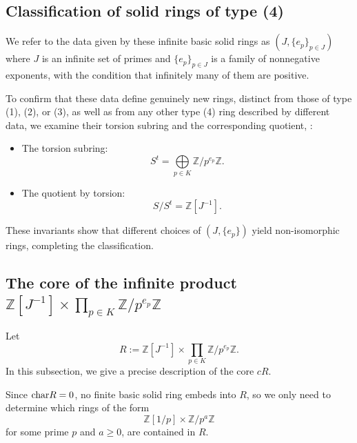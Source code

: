 \documentclass{amsart}
\newcommand{\chara}{{\textup{char}}}
\newcommand{\Z}{{\mathbb Z}}
\begin{document}
    \subsection{Classification of solid rings of type (4)}

    We refer to the data given by these infinite basic solid rings as $(J, \{e_p\}_{p \in J})$ where $J$ is an infinite set of primes and $\{e_p\}_{p \in J}$ is a family of nonnegative exponents, with the condition that infinitely many of them are positive.
    
    To confirm that these data define genuinely new rings, distinct from those of type (1), (2), or (3), as well as from any other type (4) ring described by different data, we examine their torsion subring and the corresponding quotient, \cite[Example 3.2]{BK71}:
    \begin{itemize}
        \item The torsion subring:  
        $$
        S^t = \bigoplus\limits_{p \in K} \Z/p^{e_p}\Z.
        $$

        \item The quotient by torsion:
        $$
        S/S^t = \Z[J^{-1}].
        $$
    \end{itemize}
    These invariants show that different choices of \( (J, \{e_p\}) \) yield non-isomorphic rings, completing the classification.


    \subsection{The core of the infinite product $\Z[J^{-1}] \times \prod\limits_{p \in K} \Z/p^{e_p}\Z$}
    \label{ss:inf_prod}
    \noindent
    
    Let
    $$
    R := \Z[J^{-1}] \times \prod\limits_{p \in K} \Z/p^{e_p}\Z.
    $$
    In this subsection, we give a precise description of the core $cR$.

    Since $\chara{R} = 0$, no finite basic solid ring embeds into $R$, so we only need to determine which rings of the form 
    $$
    \Z[1/p] \times \Z/p^a\Z
    $$
    for some prime $p$ and $a \geq 0$, are contained in $R$.
    
\end{document}
